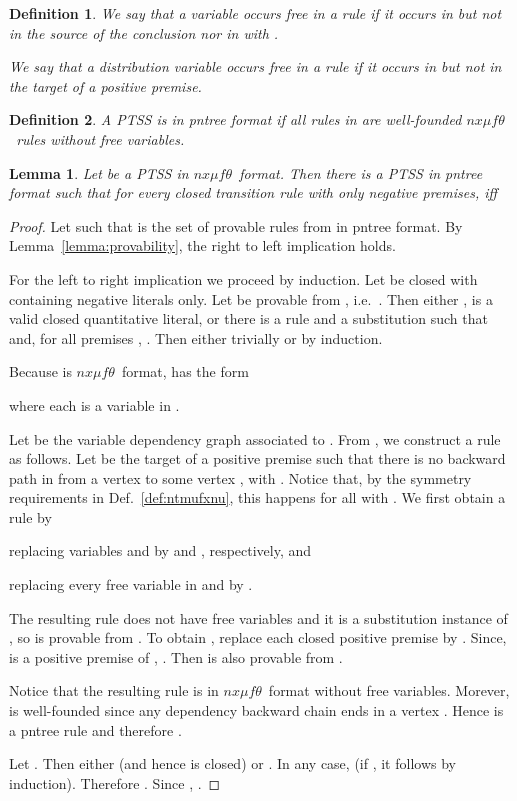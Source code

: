 \documentclass[submission,copyright,creativecommons]{eptcs}
\newtheorem{definition}{Definition}
\newtheorem{lemma}{Lemma}
\newcommand{\nxmuft}{\ensuremath{\textit{nx}\mu\textit{f}\theta}}
\newcommand{\colorpar}[3]{\colorbox{#1}{\parbox{#2}{#3}}}
\newcommand{\marginremark}[3]{\marginpar{\colorpar{#2}{\linewidth}{\color{#1}#3}}}
\newcommand{\remarkDG}[1]{\marginremark{darkgreen}{lightyellow}{\tiny{[DG]~ #1}}}
\renewcommand{\remarkDG}[1]{}
\begin{document}
\begin{definition}
We say that a variable  occurs \emph{free} in a rule  if it
occurs in  but not in the source of the conclusion nor in 
 with . 
\remarkDG{Does a instantiable dirac distribution  as part of  not also bind a variable and this should be included in the def?}
We say that a distribution variable  occurs \emph{free} in a rule  if it occurs in  
but not in the target of a positive premise. \end{definition}

\begin{definition}
 A PTSS  is in \emph{pntree format} if
 all rules in  are well-founded \nxmuft\ rules without free variables. 
\end{definition}

\begin{lemma}\label{lemma:pntree}
  Let  be a PTSS in \nxmuft\ format.
  Then there is a PTSS  in
  pntree format such that for every closed transition rule 
  with only negative premises,
   iff 
\end{lemma}
\begin{proof}
 Let  such that  is the set of provable rules 
 from  in pntree format. 
 By Lemma~\ref{lemma:provability}, the right to left implication holds. 

 For the left to right implication we proceed by induction.
Let  be closed with  containing negative literals
 only. Let  be provable from ,
 i.e.\ .  Then either ,  is a
 valid closed quantitative literal, or there is a rule  and a
 substitution  such that  and, for all
 premises , .
 Then  either trivially or by
 induction.

 Because  is \nxmuft\ format,  has the form

where each  is a variable in .


 Let  be the variable dependency graph associated to
 .
From , we construct a rule  as follows.
Let  be the target of a positive premise such that
 there is no backward path in  from a vertex  to
 some vertex , with .  Notice
 that, by the symmetry requirements in Def.~\ref{def:ntmufxnu}, this
 happens for all  with .
We first obtain a rule  by
 \begin{inparaenum}[(i)]
 \item replacing variables  and  by
    and , respectively,
   and
 \item replacing every free variable  in  and  by
   .
 \end{inparaenum}
The resulting rule  does not have free variables and it is a
 substitution instance of , so  is provable from .
To obtain , replace each closed positive premise
  by .  Since,
  is a positive premise of ,
 .
 Then  is also provable from .

 Notice that the resulting rule  is in \nxmuft\ format without
 free variables.  Morever,  is well-founded since any dependency
 backward chain ends in a vertex .  Hence  is a pntree rule
 and therefore .

 Let . Then either  (and hence  is closed)
 or . In any case, 
 (if , it follows by induction). Therefore
 .  Since
 , .
\end{proof}
\end{document}
